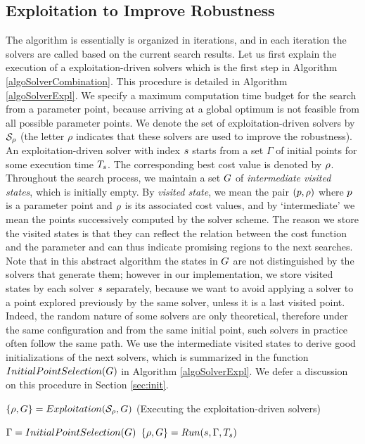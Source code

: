 \subsection{Exploitation to Improve Robustness}
The algorithm is essentially is organized in iterations, and in each iteration the solvers are called based on the current search results. Let us first explain the execution of a exploitation-driven solvers which is the first step in Algorithm \ref{algoSolverCombination}. This procedure is detailed in Algorithm \ref{algoSolverExpl}. We specify a maximum computation time budget for the search from a parameter point, because arriving at a global optimum is not feasible from all possible parameter points. We denote the set of exploitation-driven solvers by $\mathcal{S_{\rho}}$ (the letter $\rho$ indicates that these solvers are used to improve the robustness). An exploitation-driven solver with index $s$ starts from a set $\Gamma$ of initial points for some execution time $T_{s}$. The corresponding best cost value is denoted by $\rho$. Throughout the search process, we maintain a set $G$ of {\em intermediate visited states}, which is initially empty. By {\em visited state}, we mean the pair $(p, \rho)$ where $p$ is a parameter point and $\rho$ is its associated cost values, and by `intermediate' we mean the points successively computed by the solver scheme. The reason we store the visited states is that they can reflect the relation between the cost function and the parameter and can thus indicate promising regions to the next searches. Note that in this abstract algorithm the states in $G$ are not distinguished by the solvers that generate them; however in our implementation, we store visited states by each solver $s$ separately, because we want to avoid applying a solver to a point explored previously by the same solver, unless it is a last visited point. Indeed, the random nature of some solvers are only theoretical, therefore under the same configuration and from the same initial point, such solvers in practice often follow the same path. We use the intermediate visited states to derive good initializations of the next solvers, which is summarized in the function $InitialPointSelection(G)$ in Algorithm \ref{algoSolverExpl}. We defer a discussion on this procedure in Section \ref{sec:init}.

\begin{algorithm}
\caption{$\{ \rho, G \}=Exploitation(\mathcal{S_{\rho}}, G)$ 
(Executing the exploitation-driven solvers) \label{algoSolverExpl}}
\begin{algorithmic}
		\ForAll{$\solver \in \solversetRho$} 
		\State $\Gamma = InitialPointSelection(G)$
		\State {}
  		\State $\{ \rho, G \} = Run(s, \Gamma, T_{s})$ 
		\EndFor
\end{algorithmic}
\end{algorithm}


